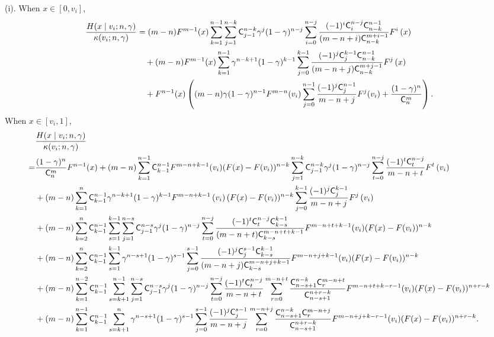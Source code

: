 \begin{lemma}
 \label{lem:H_h}
(i). When $x \in [0,v_i]$,
\begin{align*}
\frac{H(x\mid v_i;n,\gamma)}{\kappa(v_i;n,\gamma)} &=   
 (m-n)F^{m-1}(x)\sum_{k=1}^{n-1}  \sum_{j=1}^{n-k}\mathsf{C}^{n-k}_{j-1}\gamma^j
 (1-\gamma)^{n-j}\sum_{i=0}^{n-j}\frac{(-1)^{i}\mathsf{C}^{n-j}_i\mathsf{C}^{n-1}_{n-k}}{(m-n+i)\mathsf{C}^{m+i-1}_{n-k}}F^i\left(x\right)\\
 & \quad + (m-n)F^{m-1}(x)\sum_{k=1}^{n-1} \gamma^{n-k+1}
 (1-\gamma)^{k-1}\sum_{j=0}^{k-1}\frac{(-1)^{j}\mathsf{C}^{k-1}_j\mathsf{C}^{n-1}_{n-k}}{(m-n+j)\mathsf{C}^{m+j-1}_{n-k}}F^{j}\left(x\right) \\
 &\quad + F^{n-1}(x)\left((m-n)\gamma(1-\gamma)^{n-1}F^{m-n}(v_i)\sum_{j=0}^{n-1}\frac{(-1)^j\mathsf{C}^{n-1}_j}{m-n+j}F^j(v_i) + \frac{(1-\gamma)^n}{\mathsf{C}^m_n}\right).
\end{align*}
When $x \in [v_i, 1]$, 
{\footnotesize{
\begin{align*}
&\frac{H(x\mid v_i;n,\gamma)}{\kappa(v_i;n,\gamma)}\\
=& \frac{(1-\gamma)^n}{\C^m_n}F^{n-1}(x) + (m-n)\sum_{k=1}^{n-1} \C^{n-1}_{k-1}F^{m-n+k-1}(v_i)(F(x) - F(v_i))^{n-k} \sum_{j=1}^{n-k} \C^{n-k}_{j-1}\gamma^j
 (1-\gamma)^{n-j}\sum_{t=0}^{n-j}\frac{(-1)^{t}\C^{n-j}_t}{m-n+t}F^{t}\left(v_{i}\right)\\
 & + (m-n)\sum_{k=1}^{n}\C^{n-1}_{k-1} \gamma^{n-k+1}
 (1-\gamma)^{k-1}F^{m-n+k-1}\left(v_{i}\right)(F(x) - F(v_i))^{n-k}\sum_{j=0}^{k-1}\frac{(-1)^{j}\C^{k-1}_j}{m-n+j}F^{j}\left(v_{i}\right)\\
 & + (m-n) \sum_{k=2}^{n}\C^{n-1}_{k-1}\sum_{s=1}^{k-1}\sum_{j=1}^{n-s} \C^{n-s}_{j-1}\gamma^j
 (1-\gamma)^{n-j}\sum_{t=0}^{n-j}\frac{(-1)^{t}\C^{n-j}_t\C^{k-1}_{k-s}}{(m-n+t)\C^{m-n+t+k-1}_{k-s}}F^{m-n+t+k-1}(v_i)(F(x) - F(v_i))^{n-k}\\
 & + (m-n)\sum_{k=2}^{n} \C^{n-1}_{k-1}\sum_{s=1}^{k-1}\gamma^{n-s+1}
 (1-\gamma)^{s-1}\sum_{j=0}^{s-1}\frac{(-1)^{j}\C^{s-1}_j\C^{k-1}_{k-s}}{(m-n+j)\C^{m-n+j+k-1}_{k-s}}F^{m-n+j+k-1}(v_i)(F(x) - F(v_i))^{n-k}\\
 & + (m-n)\sum_{k=1}^{n-2} \C^{n-1}_{k-1}\sum_{s=k+1}^{n-1}\sum_{j=1}^{n-s} \C^{n-s}_{j-1}\gamma^j
 (1-\gamma)^{n-j}\sum_{t=0}^{n-j}\frac{(-1)^{t}\C^{n-j}_t}{m-n+t}\sum_{r=0}^{m-n+t}\frac{\C^{n-k}_{n-s+1}\C^{m-n+t}_r}{\C^{n+r-k}_{n-s+1}}F^{m-n+t+k-r-1}(v_i)(F(x) - F(v_i))^{n+r-k}\\
 & + (m-n)\sum_{k=1}^{n-1}\C^{n-1}_{k-1} \sum_{s=k+1}^{n}\gamma^{n-s+1}
 (1-\gamma)^{s-1}\sum_{j=0}^{s-1}\frac{(-1)^{j}\C^{s-1}_j}{m-n+j}\sum_{r=0}^{m-n+j}\frac{\C^{n-k}_{n-s+1}\C^{m-n+j}_r}{\C^{n+r-k}_{n-s+1}}F^{m-n+j+k-r-1}(v_i)(F(x) - F(v_i))^{n+r-k}.

\end{align*}}}
\end{lemma}
